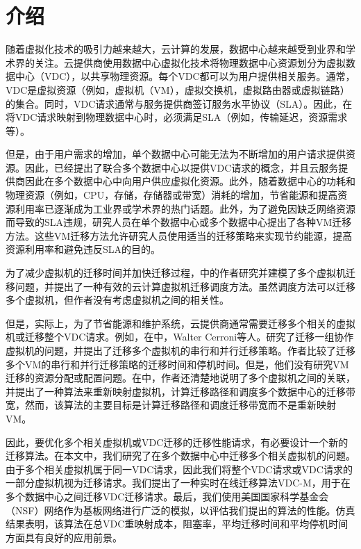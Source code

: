 \chapter{介绍}
随着虚拟化技术的吸引力越来越大，云计算的发展，数据中心越来越受到业界和学术界的关注。云提供商使用数据中心虚拟化技术将物理数据中心资源划分为虚拟数据中心（VDC），以共享物理资源。每个VDC都可以为用户提供相关服务。通常，VDC是虚拟资源（例如，虚拟机（VM），虚拟交换机，虚拟路由器或虚拟链路）的集合。同时，VDC请求通常与服务提供商签订服务水平协议（SLA）。因此，在将VDC请求映射到物理数据中心时，必须满足SLA（例如，传输延迟，资源需求等）。

但是，由于用户需求的增加，单个数据中心可能无法为不断增加的用户请求提供资源。因此，已经提出了联合多个数据中心以提供VDC请求的概念，并且云服务提供商因此在多个数据中心中向用户供应虚拟化资源\cite{jin2012efficient,amokrane2013greenhead,xu2015rethink}。此外，随着数据中心的功耗和物理资源（例如，CPU，存储，存储器或带宽）消耗的增加，节省能源和提高资源利用率已逐渐成为工业界或学术界的热门话题。此外，为了避免因缺乏网络资源而导致的SLA违规，研究人员在单个数据中心或多个数据中心提出了各种VM迁移方法\cite{adami2013virtual,aiash2014secure,zhang2013scheduling,cerroni2014multiple,callegati2013live,sarker2013performance}。这些VM迁移方法允许研究人员使用适当的迁移策略来实现节约能源，提高资源利用率和避免违反SLA的目的。

为了减少虚拟机的迁移时间并加快迁移过程，\cite{zhang2013scheduling}中的作者研究并建模了多个虚拟机迁移问题，并提出了一种有效的云计算虚拟机迁移调度方法。虽然调度方法可以迁移多个虚拟机，但作者没有考虑虚拟机之间的相关性。

但是，实际上，为了节省能源和维护系统，云提供商通常需要迁移多个相关的虚拟机或迁移整个VDC请求。例如，在\cite{cerroni2014multiple,callegati2013live}中，Walter Cerroni等人。研究了迁移一组协作虚拟机的问题，并提出了迁移多个虚拟机的串行和并行迁移策略。作者比较了迁移多个VM的串行和并行迁移策略的迁移时间和停机时间。但是，他们没有研究VM迁移的资源分配或配置问题。在\cite{sarker2013performance}中，作者还清楚地说明了多个虚拟机之间的关联，并提出了一种算法来重新映射虚拟机，计算迁移路径和调度多个数据中心的迁移带宽，然而，该算法的主要目标是计算迁移路径和调度迁移带宽而不是重新映射VM。

因此，要优化多个相关虚拟机或VDC迁移的迁移性能请求，有必要设计一个新的迁移算法。在本文中，我们研究了在多个数据中心中迁移多个相关虚拟机的问题。由于多个相关虚拟机属于同一VDC请求，因此我们将整个VDC请求或VDC请求的一部分虚拟机视为迁移请求。我们提出了一种实时在线迁移算法VDC-M，用于在多个数据中心之间迁移VDC迁移请求。最后，我们使用美国国家科学基金会（NSF）网络作为基板网络进行广泛的模拟，以评估我们提出的算法的性能。仿真结果表明，该算法在总VDC重映射成本，阻塞率，平均迁移时间和平均停机时间方面具有良好的应用前景。

